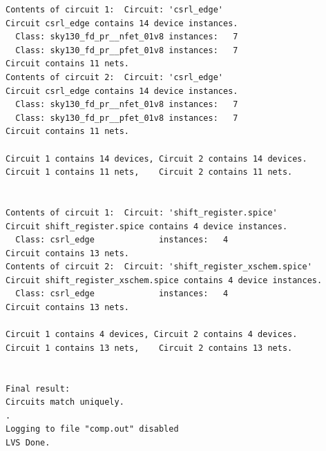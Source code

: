 \documentclass[11pt]{article}
\begin{document}
\begin{lstlisting}
Contents of circuit 1:  Circuit: 'csrl_edge'
Circuit csrl_edge contains 14 device instances.
  Class: sky130_fd_pr__nfet_01v8 instances:   7
  Class: sky130_fd_pr__pfet_01v8 instances:   7
Circuit contains 11 nets.
Contents of circuit 2:  Circuit: 'csrl_edge'
Circuit csrl_edge contains 14 device instances.
  Class: sky130_fd_pr__nfet_01v8 instances:   7
  Class: sky130_fd_pr__pfet_01v8 instances:   7
Circuit contains 11 nets.

Circuit 1 contains 14 devices, Circuit 2 contains 14 devices.
Circuit 1 contains 11 nets,    Circuit 2 contains 11 nets.


Contents of circuit 1:  Circuit: 'shift_register.spice'
Circuit shift_register.spice contains 4 device instances.
  Class: csrl_edge             instances:   4
Circuit contains 13 nets.
Contents of circuit 2:  Circuit: 'shift_register_xschem.spice'
Circuit shift_register_xschem.spice contains 4 device instances.
  Class: csrl_edge             instances:   4
Circuit contains 13 nets.

Circuit 1 contains 4 devices, Circuit 2 contains 4 devices.
Circuit 1 contains 13 nets,    Circuit 2 contains 13 nets.


Final result: 
Circuits match uniquely.
.
Logging to file "comp.out" disabled
LVS Done.
\end{lstlisting}

\newpage
\end{document}
